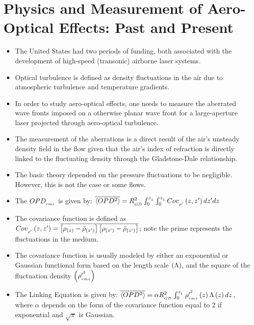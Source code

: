     \section{Physics and Measurement of Aero-Optical Effects: Past and Present \cite{jumper:arofm:2017}}
        \begin{itemize}
            \item The United States had two periods of funding, both associated with the development of high-speed (transonic) airborne laser systems.
            \item Optical turbulence is defined as density fluctuations in the air due to atmospheric turbulence and temperature gradients. 
            \item In order to study aero-optical effects, one needs to measure the aberrated wave fronts imposed on a otherwise planar wave front for a large-aperture laser projected through aero-optical turbulence. 
            \item The measurement of the aberrations is a direct result of the air's unsteady density field in the flow given that the air's index of refraction is directly linked to the fluctuating density through the Gladstone-Dale relationship. 
            \item The basic theory depended on the pressure fluctuations to be negligible. However, this is not the case or some flows.
            \item The $OPD_{_{rms}}$ is given by: $\overline{\langle OPD^2\rangle} = R_{_{GD}}^2\int^{z_{_{1}}}_{0}\int^{z_{_{1}}}_{0}Cov_{_{\rho^{\prime}}}\left(z,z^{\prime}\right)dz^{\prime}dz $
            \item The covariance function is defined as $Cov_{_{\rho^{\prime}}}\left(z,z^{\prime}\right) = \overline{ \left[\rho_{\left(z\right)} - \bar{\rho}_{\left(z^{\prime}\right)}\right] \left[\rho_{\left(z^{\prime}\right)} - \bar{\rho}_{\left(z^{\prime}\right)}\right] } $; note the prime represents the fluctuations in the medium. 
            \item The covariance function is usually modeled by either an exponential or Gaussian functional form based on the length scale $\left(\Lambda\right)$, and the square of the fluctuation density $\left(\rho^{{\prime}^2}_{_{rms}}\right)$
            \item The Linking Equation is given by: $ \overline{\langle OPD^2\rangle} = \alpha R_{_{GD}}^2\int^{z_{_{1}}}_0 \rho^{{\prime}^2}_{_{rms}}  \left(z\right)\Lambda\left(z\right)dz$, where $\alpha$ depends on the form of the covariance function equal to $2$ if exponential and $\sqrt{\pi}$ is Gaussian.
        \end{itemize}


